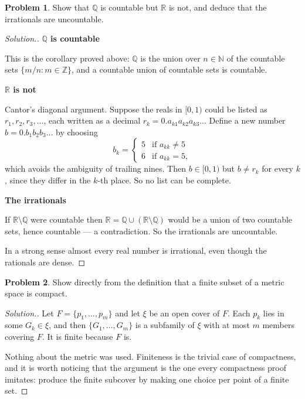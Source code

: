 \documentclass[11pt,a4paper]{article}
\theoremstyle{definition}
\newtheorem{problemx}{Problem}[section]
\newenvironment{problem}{\begin{problemx}}{\end{problemx}}
\newenvironment{solution}
  {\renewcommand{\qedsymbol}{}\begin{proof}[\textit{Solution}.]}
  {\end{proof}}
\newcommand{\subhead}[1]{%
  \par\medskip\noindent\textbf{#1}\par\nobreak\smallskip}
\begin{document}
\begin{problem}
Show that $\mathbb{Q}$ is countable but $\mathbb{R}$ is not, and deduce that the
irrationals are uncountable.
\end{problem}
\begin{solution}
\subhead{$\mathbb{Q}$ is countable}
This is the corollary proved above: $\mathbb{Q}$ is the union over $n\in
\mathbb{N}$ of the countable sets $\{m/n:m\in\mathbb{Z}\}$, and a countable
union of countable sets is countable.

\subhead{$\mathbb{R}$ is not}
Cantor's diagonal argument. Suppose the reals in $[0,1)$ could be listed as
$r_1,r_2,r_3,\dots$, each written as a decimal
$r_k=0.a_{k1}a_{k2}a_{k3}\dots$ Define a new number
$b=0.b_1b_2b_3\dots$ by choosing
$$b_k=\begin{cases}5 & \text{if } a_{kk}\neq 5\\ 6 & \text{if } a_{kk}=5,\end{cases}$$
which avoids the ambiguity of trailing nines. Then $b\in[0,1)$ but $b\neq r_k$
for every $k$, since they differ in the $k$-th place. So no list can be
complete.

\subhead{The irrationals}
If $\mathbb{R}\setminus\mathbb{Q}$ were countable then
$\mathbb{R}=\mathbb{Q}\cup(\mathbb{R}\setminus\mathbb{Q})$ would be a union of
two countable sets, hence countable --- a contradiction. So the irrationals are
uncountable.

In a strong sense almost every real number is irrational, even though the
rationals are dense.
\end{solution}

\begin{problem}
Show directly from the definition that a finite subset of a metric space is
compact.
\end{problem}
\begin{solution}
Let $F=\{p_1,\dots,p_m\}$ and let $\xi$ be an open cover of $F$. Each $p_k$ lies
in some $G_k\in\xi$, and then $\{G_1,\dots,G_m\}$ is a subfamily of $\xi$ with
at most $m$ members covering $F$. It is finite because $F$ is.

Nothing about the metric was used. Finiteness is the trivial case of
compactness, and it is worth noticing that the argument is the one every
compactness proof imitates: produce the finite subcover by making one choice per
point of a finite set.
\end{solution}
\end{document}
